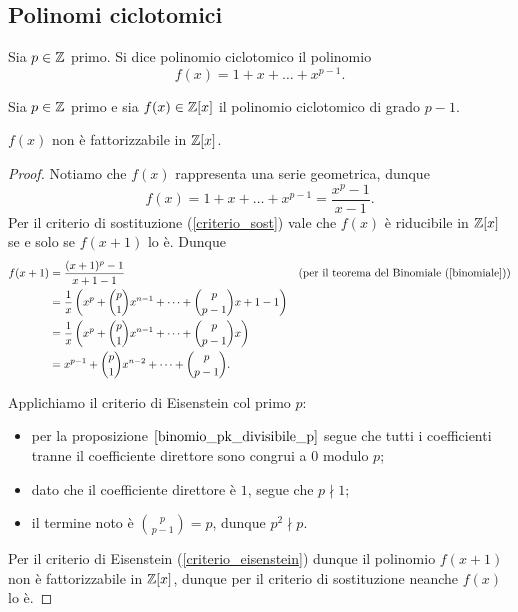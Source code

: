 \subsection{Polinomi ciclotomici}

\begin{definition}
    Sia $p \in \mathbb{Z}$ primo. Si dice polinomio ciclotomico il polinomio \[
        f(x) = 1 + x + \dots + x^{p-1}.    
    \]
\end{definition}

\begin{proposition}
    Sia $p \in \mathbb{Z}$ primo e sia $f(x) \in \mathbb{Z}[x]$ il polinomio ciclotomico di grado $p-1$. 

    $f(x)$ non è fattorizzabile in $\mathbb{Z}[x]$.
\end{proposition}
\begin{proof}
    Notiamo che $f(x)$ rappresenta una serie geometrica, dunque \[
        f(x) = 1 + x + \dots + x^{p-1} = \frac{x^p - 1}{x - 1}.    
    \] Per il criterio di sostituzione (\ref{criterio_sost}) vale che $f(x)$ è riducibile in $\mathbb{Z}[x]$ se e solo se $f(x+1)$ lo è. Dunque
    \begin{align*}
        f(x+1) &= \frac{(x+1)^p - 1}{x+1-1} &&\text{(per il teorema del Binomiale (\ref{binomiale}))}\\
        &= \frac1x \left( x^p + \binom{p}{1}x^{n-1} + \dots + \binom{p}{p-1}x + 1 - 1 \right)\\
        &= \frac1x \left( x^p + \binom{p}{1}x^{n-1} + \dots + \binom{p}{p-1}x \right)\\
        &= x^{p-1} + \binom{p}{1}x^{n-2} + \dots + \binom{p}{p-1}.
    \end{align*}

    Applichiamo il criterio di Eisenstein col primo $p$:
    \begin{itemize}
        \item per la proposizione $\ref{binomio_pk_divisibile_p}$ segue che tutti i coefficienti tranne il coefficiente direttore sono congrui a $0$ modulo $p$;
        \item dato che il coefficiente direttore è $1$, segue che $p \nmid 1$;
        \item il termine noto è $\binom{p}{p-1} = p$, dunque $p^2 \nmid p$.
    \end{itemize}
    Per il criterio di Eisenstein (\ref{criterio_eisenstein}) dunque il polinomio $f(x+1)$ non è fattorizzabile in $\mathbb{Z}[x]$, dunque per il criterio di sostituzione neanche $f(x)$ lo è. 
\end{proof}